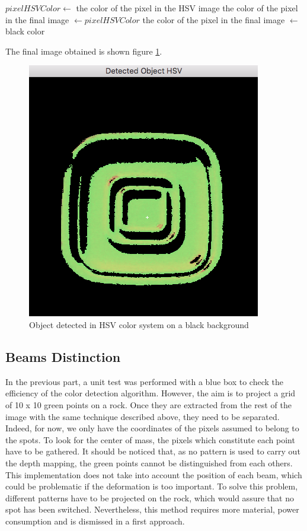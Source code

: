 \begin{algorithmic}
    			\State $pixelHSVColor \gets$ the color of the pixel in the HSV image
    			\State the color of the pixel in the final image $\gets pixelHSVColor$
		\Else
        			\State the color of the pixel in the final image $\gets$ black color
		\EndIf
	\EndFor
\EndFunction
\end{algorithmic}

The final image obtained is shown figure \ref{fig:finalImage}.

\begin{figure}[h]
  \centering
  \includegraphics[scale=0.6]{fig/finalImage.png}
  \caption{Object detected in HSV color system on a black background}
  \label{fig:finalImage}
\end{figure}

\subsection{Beams Distinction}
In the previous part, a unit test was performed with a blue box to check the efficiency of the color detection algorithm. However, the aim is to project a grid of 10 x 10 green points on a rock. Once they are extracted from the rest of the image with the same technique described above, they need to be separated. Indeed, for now, we only have the coordinates of the pixels assumed to belong to the spots. To look for the center of mass, the pixels which constitute each point have to be gathered. It should be noticed that, as no pattern is used to carry out the depth mapping, the green points cannot be distinguished from each others. This implementation does not take into account the position of each beam, which could be problematic if the deformation is too important. To solve this problem, different patterns have to be projected on the rock, which would assure that no spot has been switched. Nevertheless, this method requires more material, power consumption and is dismissed in a first approach.

